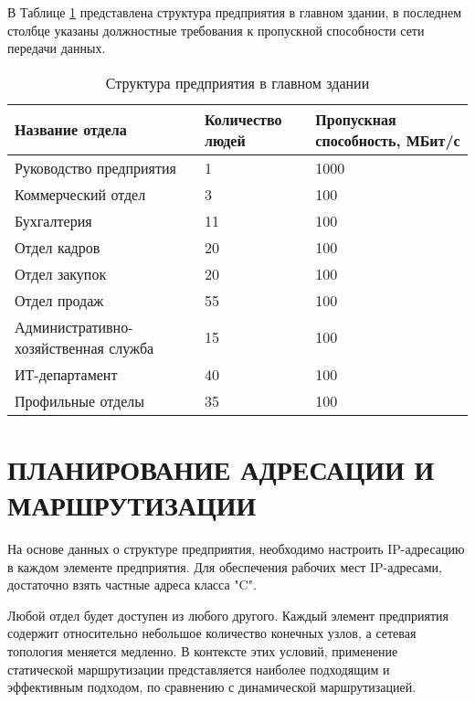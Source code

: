 \documentclass[14pt, a4paper]{extarticle}
\begin{document}
В Таблице \ref{table:1:mainDepStructure} представлена структура предприятия в главном здании, 
в последнем столбце указаны должностные требования к пропускной
способности сети передачи данных.
\begin{table}[H]
\centering
\small
\caption{Структура предприятия в главном здании}
\begin{tabular}{|m{5cm}|m{3cm}|m{3cm}|}
\hline
\textbf{Название отдела} & \textbf{Количество людей} & \textbf{Пропускная способность, МБит/с} \\
\hline
Руководство предприятия & 1 & 1000 \\
\hline
Коммерческий отдел & 3 & 100 \\
\hline
Бухгалтерия & 11 & 100 \\
\hline
Отдел кадров & 20 & 100 \\
\hline
Отдел закупок & 20 & 100 \\
\hline
Отдел продаж & 55 & 100 \\
\hline
Административно-хозяйственная служба & 15 & 100 \\
\hline
ИТ-департамент & 40 & 100 \\
\hline
Профильные отделы & 35 & 100 \\
\hline
\end{tabular}
\label{table:1:mainDepStructure}
\end{table}



\section[ПЛАНИРОВАНИЕ АДРЕСАЦИИ И МАРШРУТИЗАЦИИ]{ПЛАНИРОВАНИЕ АДРЕСАЦИИ И \\ МАРШРУТИЗАЦИИ}
На основе данных о структуре предприятия,
необходимо настроить IP-адресацию в каждом элементе
предприятия. Для обеспечения рабочих мест IP-адресами, достаточно взять частные адреса класса "C".


Любой отдел будет доступен из любого другого.
Каждый элемент предприятия содержит относительно небольшое количество конечных узлов, 
а сетевая топология меняется медленно. В контексте этих условий, применение 
статической маршрутизации представляется наиболее подходящим и эффективным подходом, 
по сравнению с динамической маршрутизацией.\cite{habr-routing}
\end{document}
